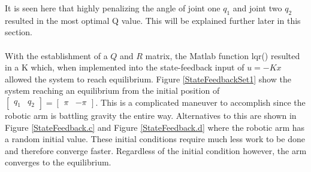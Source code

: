 \documentclass[12pt]{article}
\begin{document}
It is seen here that highly penalizing the angle of joint one $q_{1}$ and joint two $q_{2}$ resulted in the most optimal Q value. This will be explained further later in this section.
\\ \\
With the establishment of a $Q$ and $R$ matrix, the Matlab function lqr() resulted in a K which, when implemented into the state-feedback input of $u=-Kx$ allowed the system to reach equilibrium. Figure \ref{StateFeedbackSet1} show the system reaching an equilibrium from the initial position of $\begin{bmatrix} q_{1} & q_{2} \end{bmatrix} = \begin{bmatrix} \pi & -\pi \end{bmatrix}$. This is a complicated maneuver to accomplish since the robotic arm is battling gravity the entire way.  Alternatives to this are shown in Figure \ref{StateFeedback.c} and Figure \ref{StateFeedback.d} where the robotic arm has a random initial value. These initial conditions require much less work to be done and therefore converge faster. Regardless of the initial condition however, the arm converges to the equilibrium. 
\end{document}
